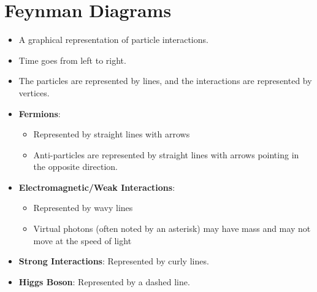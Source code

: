\documentclass{article}
\begin{document}
\section{Feynman Diagrams}
\begin{itemize}
    \item A graphical representation of particle interactions.
    \item Time goes from left to right.
    \item The particles are represented by lines, and the interactions are represented by vertices.
    \item \textbf{Fermions}: 
    \begin{itemize}
        \item Represented by straight lines with arrows
        \item Anti-particles are represented by straight lines with arrows pointing in the opposite direction.
    \end{itemize}
    \item \textbf{Electromagnetic/Weak Interactions}:
    \begin{itemize}
        \item Represented by wavy lines
        \item Virtual photons (often noted by an asterisk) may have mass and may not move at the speed of light
    \end{itemize}
    \item \textbf{Strong Interactions}: Represented by curly lines.
    \item \textbf{Higgs Boson}: Represented by a dashed line.
\end{itemize}
\end{document}
